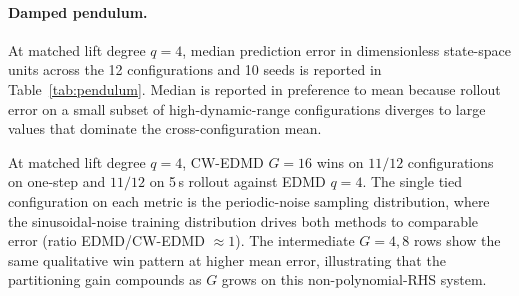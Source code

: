 \documentclass{article}
\begin{document}
\paragraph{Damped pendulum.} At matched lift degree $q{=}4$, median prediction error in dimensionless state-space units across the 12 configurations and 10 seeds is reported in Table~\ref{tab:pendulum}. Median is reported in preference to mean because rollout error on a small subset of high-dynamic-range configurations diverges to large values that dominate the cross-configuration mean.
\begin{table}[H]
\caption{Damped pendulum at matched lift degree $q{=}4$: median prediction error (dimensionless state-space units) across 12 configurations and 10 seeds. EDMD $q{=}2$ is shown as a low-lift baseline; EDMD $q{=}4$ is the matched-degree baseline for the CW-EDMD rows. Bold marks the column-wise minimum.}
\label{tab:pendulum}
\centering\small

\end{table}
\noindent At matched lift degree $q{=}4$, CW-EDMD $G{=}16$ wins on $11/12$ configurations on one-step and $11/12$ on 5\,s rollout against EDMD $q{=}4$. The single tied configuration on each metric is the periodic-noise sampling distribution, where the sinusoidal-noise training distribution drives both methods to comparable error (ratio EDMD/CW-EDMD $\approx 1$). The intermediate $G{=}4, 8$ rows show the same qualitative win pattern at higher mean error, illustrating that the partitioning gain compounds as $G$ grows on this non-polynomial-RHS system.
\end{document}
